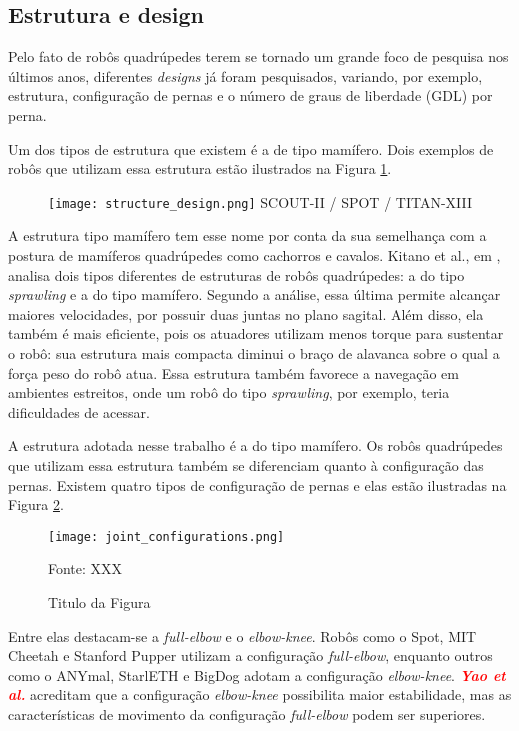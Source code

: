 \documentclass[../main.tex]{subfiles}
\begin{document}
  \subsection{Estrutura e design}
  Pelo fato de robôs quadrúpedes terem se tornado um grande foco de pesquisa nos últimos anos, diferentes \textit{designs} já foram pesquisados, variando, por exemplo, estrutura, configuração de pernas e o número de graus de liberdade (GDL) por perna. 
  
  Um dos tipos de estrutura que existem é a de tipo mamífero. Dois exemplos de robôs que utilizam essa estrutura estão ilustrados na Figura \ref{fig:structure_design}. 

  \begin{figure}
    \texttt{[image: structure\_design.png]}
    SCOUT-II / SPOT / TITAN-XIII
    \label{fig:structure_design}
  \end{figure}

  A estrutura tipo mamífero tem esse nome por conta da sua semelhança com a postura de mamíferos quadrúpedes como cachorros e cavalos. Kitano et al., em \cite{Kitano2016}, analisa dois tipos diferentes de estruturas de robôs quadrúpedes: a do tipo \textit{sprawling} e a do tipo mamífero. Segundo a análise, essa última permite alcançar maiores velocidades, por possuir duas juntas no plano sagital. Além disso, ela também é mais eficiente, pois os atuadores utilizam menos torque para sustentar o robô: sua estrutura mais compacta diminui o braço de alavanca sobre o qual a força peso do robô atua. Essa estrutura também favorece a navegação em ambientes estreitos, onde um robô do tipo \textit{sprawling}, por exemplo, teria dificuldades de acessar.

  A estrutura adotada nesse trabalho é a do tipo mamífero. Os robôs quadrúpedes que utilizam essa estrutura também se diferenciam quanto à configuração das pernas. Existem quatro tipos de configuração de pernas e elas estão ilustradas na Figura \ref{fig:joint_configurations}.
  
  \begin{figure}[h]
    \centering
    \caption{Titulo da Figura}
    \texttt{[image: joint\_configurations.png]}
    
    Fonte: XXX
    \label{fig:joint_configurations}
  \end{figure}

  Entre elas destacam-se a \textit{full-elbow} e o \textit{elbow-knee}. Robôs como o Spot, MIT Cheetah e Stanford Pupper utilizam a configuração \textit{full-elbow}, enquanto outros como o ANYmal, StarlETH e BigDog adotam a configuração  \textit{elbow-knee}. \textbf{\textcolor{red}{\textit{Yao et al.}}} acreditam que a configuração \textit{elbow-knee} possibilita maior estabilidade, mas as características de movimento da configuração \textit{full-elbow} podem ser superiores.
\end{document}
